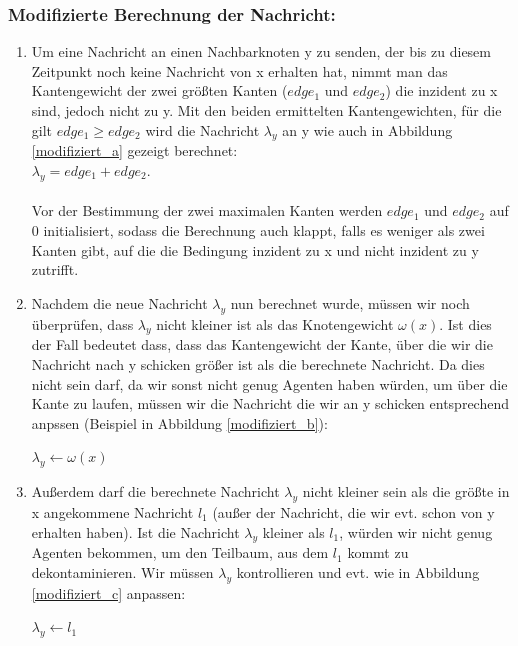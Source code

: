 \subsubsection*{Modifizierte Berechnung der Nachricht:}

\begin{enumerate}[label=\alph*)]
	
	\item 
		Um eine Nachricht an einen Nachbarknoten y zu senden, der bis zu diesem Zeitpunkt noch keine Nachricht von x erhalten hat, nimmt man das Kantengewicht der zwei größten Kanten ($edge_{1}$ und $edge_{2}$) die inzident zu x sind, jedoch nicht zu y. Mit den beiden ermittelten Kantengewichten, für die gilt $edge_{1} \ge edge_{2}$ wird die Nachricht $\lambda_{y}$ an y wie auch in Abbildung \ref{modifiziert_a} gezeigt berechnet:\\
		$\lambda_{y} = edge_{1} + edge_{2}$.
		\\
		\\
		Vor der Bestimmung der zwei maximalen Kanten werden $edge_{1}$ und $edge_{2}$ auf 0 initialisiert, sodass die Berechnung auch klappt, falls es weniger als zwei Kanten gibt, auf die die Bedingung inzident zu x und nicht inzident zu y  zutrifft.
	
	\item
		Nachdem die neue Nachricht $\lambda_{y}$ nun berechnet wurde, müssen wir noch überprüfen, dass $\lambda_{y}$ nicht kleiner ist als das Knotengewicht $\omega(x)$. Ist dies der Fall bedeutet dass, dass das Kantengewicht der Kante, über die wir die Nachricht nach y schicken größer ist als die berechnete Nachricht. Da dies nicht sein darf, da wir sonst nicht genug Agenten haben würden, um über die Kante zu laufen, müssen wir die Nachricht die wir an y schicken entsprechend anpssen (Beispiel in Abbildung \ref{modifiziert_b}):
		
		\begin{algorithmic}
			\State $\lambda_{y} \gets \omega(x)$
			\EndIf
		\end{algorithmic}
	
	\item
		Außerdem darf die berechnete Nachricht $\lambda_{y}$ nicht kleiner sein als die größte in x angekommene Nachricht $l_{1}$ (außer der Nachricht, die wir evt. schon von y erhalten haben). Ist die Nachricht $\lambda_{y}$ kleiner als $l_{1}$, würden wir nicht genug Agenten bekommen, um den Teilbaum, aus dem $l_{1}$ kommt zu dekontaminieren. Wir müssen $\lambda_{y}$ kontrollieren und evt. wie in Abbildung \ref{modifiziert_c} anpassen:
		
		\begin{algorithmic}
			\If {$\lambda_{y} \leq l_{1}$}
			\State $\lambda_{y} \gets l_{1}$
			\EndIf
		\end{algorithmic}
	
\end{enumerate}

